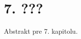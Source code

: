 \documentclass[12pt]{article}
\begin{document}
\section*{7. ???}
Abstrakt pre 7. kapitolu.
\end{document}
